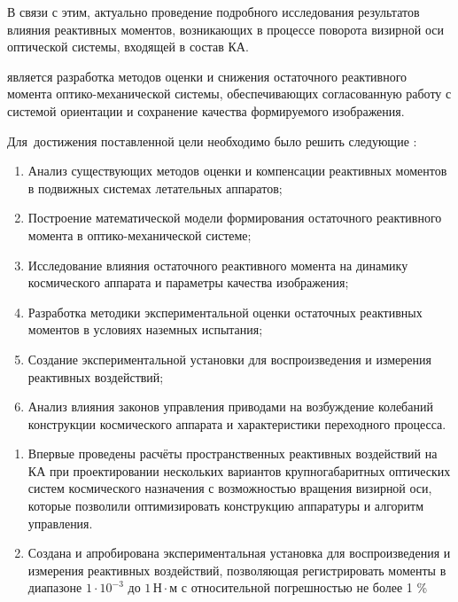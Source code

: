 В связи с этим, актуально проведение подробного исследования результатов влияния реактивных моментов, возникающих в процессе поворота визирной оси оптической системы, входящей в состав КА.



{\aim}  является разработка методов оценки и снижения остаточного реактивного момента оптико-механической системы, обеспечивающих согласованную работу с системой ориентации и сохранение качества формируемого изображения.

Для~достижения поставленной цели необходимо было решить следующие {\tasks}:
\begin{enumerate}[beginpenalty=10000] %
  \item Анализ существующих методов оценки и компенсации реактивных моментов в подвижных системах летательных аппаратов;
  \item Построение математической модели формирования остаточного реактивного момента в оптико-механической системе;
  \item Исследование влияния остаточного реактивного момента на динамику космического аппарата и параметры качества изображения;
  \item Разработка методики экспериментальной оценки остаточных реактивных моментов в условиях наземных испытания;
  \item Создание экспериментальной установки для воспроизведения и измерения реактивных воздействий;
  \item Анализ влияния законов управления приводами на возбуждение колебаний конструкции космического аппарата и характеристики переходного процесса.
\end{enumerate}


{\novelty}
\begin{enumerate}[beginpenalty=10000] %
  \item Впервые проведены расчёты пространственных реактивных воздействий на КА при проектировании нескольких вариантов крупногабаритных оптических систем космического назначения с возможностью вращения визирной оси, которые позволили оптимизировать конструкцию аппаратуры и алгоритм управления.
  \item Создана и апробирована экспериментальная установка для воспроизведения и измерения реактивных воздействий, позволяющая регистрировать моменты в диапазоне $1 \cdot 10^{-3}$ до $1\,\text{Н}\cdot\text{м}$ с относительной погрешностью не более 1 \%
\end{enumerate}

